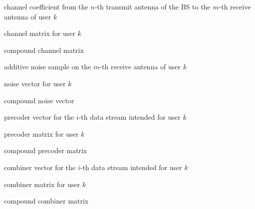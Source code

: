 \begin{description}[labelsep=0.25em, font=\normalfont]
    \newcommand{\symbolsep}{\vspace{0.55em}}

    \item[$ h_{k, \, (m, \, n)} \in \mathbb{C} \quad \text{---} \quad $]   channel coefficient from the $n$-th transmit antenna of the \acs{BS} to the $m$-th \phantom{000000000000} receive antenna of user $k$
    \item[$ \mathbf{H}_k \in \mathbb{C}^{N_R \times N_T} \quad \text{---} \quad $]   channel matrix for user $k$
    \item[$ \mathbf{H} = {\big[ \mathbf{H}_1^T \; \dots \; \mathbf{H}_K^T \big]^T} \in \mathbb{C}^{KN_R \times N_T} \quad \text{---} \quad $]   compound channel matrix
    \symbolsep

    \item[$ n_{k, \, m} \in \mathbb{C} \quad \text{---} \quad $]   additive noise sample on the $m$-th receive antenna of user $k$
    \item[$ \mathbf{n}_k = {[ n_{k, \, 1} \; \dots \; n_{k, \, N_R} ]}^T \in \mathbb{C}^{N_R} \quad \text{---} \quad $]   noise vector for user $k$
    \item[$ \mathbf{n} = {[ \mathbf{n}_1^T \; \dots \; \mathbf{n}_K^T ]}^T \in \mathbb{C}^{KN_R} \quad \text{---} \quad $]   compound noise vector
    \symbolsep

    \item[$ \mathbf{f}_{k, \, i} \in \mathbb{C}^{N_T} \quad \text{---} \quad $]   precoder vector for the $i$-th data stream intended for user $k$
    \item[$ \mathbf{F}_k = {\big[ \mathbf{f}_{k, \, 1} \; \dots \; \mathbf{f}_{k, \, N_S} \big]} \in \mathbb{C}^{N_T \times N_S} \quad \text{---} \quad $]   precoder matrix for user $k$
    \item[$ \mathbf{F} = {\big[ \mathbf{F}_1 \; \dots \; \mathbf{F}_K \big]} \in \mathbb{C}^{N_T \times KN_S} \quad \text{---} \quad $]   compound precoder matrix
    \symbolsep

    \item[$ \mathbf{g}_{k, \, i} \in \mathbb{C}^{N_R} \quad \text{---} \quad $]   combiner vector for the $i$-th data stream intended for user $k$
    \item[$ \mathbf{G}_k = {\big[ \mathbf{g}_{k, \, 1}^T \; \dots \; \mathbf{g}_{k, \, N_S}^T \big]^T} \in \mathbb{C}^{N_S \times N_R} \quad \text{---} \quad $]   combiner matrix for user $k$
    \item[$ \mathbf{G} = \operatorname{diag}\!\big( \mathbf{G}_1, \; \dots, \; \mathbf{G}_K \big) \in \mathbb{C}^{KN_S \times KN_R} \quad \text{---} \quad $]   compound combiner matrix
    \symbolsep

\end{description}

